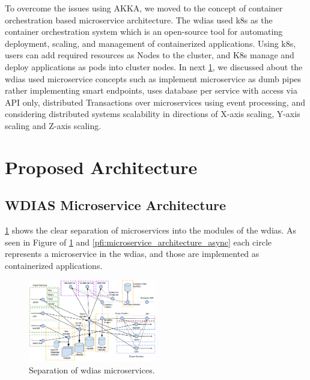 \documentclass[conference]{IEEEtran}
\newcommand{\db}[1]{\textcolor{blue!40}{#1}}
\begin{document}
To overcome the issues using AKKA, we moved to the concept of container orchestration based microservice architecture. The \acrshort{wdias} used \acrfull{k8s} as the container orchestration system which is an open-source tool for automating deployment, scaling, and management of containerized applications. Using \acrshort{k8s}, users can add required resources as Nodes to the cluster, and K8s manage and deploy applications as pods into cluster nodes.
In next \cref{pse:wdias_architecture}, we discussed about the \acrshort{wdias} used microservice concepts such as implement microservice as dumb pipes rather implementing smart endpoints, uses database per service with access via API only, distributed Transactions over microservices using event processing, and considering distributed systems scalability in directions of X-axis scaling, Y-axis scaling and Z-axis scaling.

\section{\db{Proposed Architecture}}
\label{pse:wdias_architecture}

\subsection{WDIAS Microservice Architecture}
\label{psubse:wdias_microservices}

\cref{pfi:microservice_separation} shows the clear separation of microservices into the modules of the \acrshort{wdias}. As seen in Figure of \cref{pfi:microservice_separation} and \cref{pfi:microservice_architecture_async} each circle represents a microservice in the \acrshort{wdias}, and those are implemented as containerized applications. 

\begin{figure}[htbp]
\centerline{\includegraphics[width=0.5\textwidth]{method/microservice/separation_microservices-v4.pdf}}
\caption{Separation of \acrshort{wdias} microservices.}
\label{pfi:microservice_separation}
\end{figure}
\end{document}

